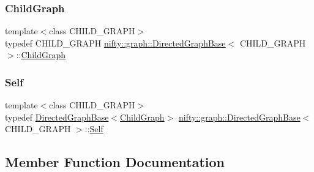\subsubsection{\texorpdfstring{Child\+Graph}{ChildGraph}}
{\footnotesize\ttfamily template$<$class C\+H\+I\+L\+D\+\_\+\+G\+R\+A\+PH$>$ \\
typedef C\+H\+I\+L\+D\+\_\+\+G\+R\+A\+PH \hyperlink{classnifty_1_1graph_1_1DirectedGraphBase}{nifty\+::graph\+::\+Directed\+Graph\+Base}$<$ C\+H\+I\+L\+D\+\_\+\+G\+R\+A\+PH $>$\+::\hyperlink{classnifty_1_1graph_1_1DirectedGraphBase_a583e01641aec296b9bc33a346f90a216}{Child\+Graph}}

\mbox{\label{classnifty_1_1graph_1_1DirectedGraphBase_ae772bf5744b9fe1af63eb1418b7ab261}} 
\subsubsection{\texorpdfstring{Self}{Self}}
{\footnotesize\ttfamily template$<$class C\+H\+I\+L\+D\+\_\+\+G\+R\+A\+PH$>$ \\
typedef \hyperlink{classnifty_1_1graph_1_1DirectedGraphBase}{Directed\+Graph\+Base}$<$\hyperlink{classnifty_1_1graph_1_1DirectedGraphBase_a583e01641aec296b9bc33a346f90a216}{Child\+Graph}$>$ \hyperlink{classnifty_1_1graph_1_1DirectedGraphBase}{nifty\+::graph\+::\+Directed\+Graph\+Base}$<$ C\+H\+I\+L\+D\+\_\+\+G\+R\+A\+PH $>$\+::\hyperlink{classnifty_1_1graph_1_1DirectedGraphBase_ae772bf5744b9fe1af63eb1418b7ab261}{Self}}



\subsection{Member Function Documentation}
\mbox{\label{classnifty_1_1graph_1_1DirectedGraphBase_a5f46662c3792297461ab24fea8edd44f}} 
